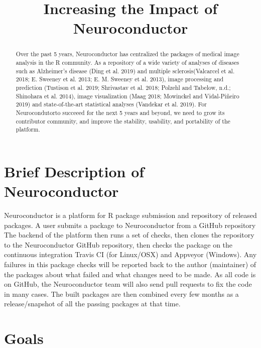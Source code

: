 \documentclass[]{elsarticle} %
\begin{document}
\begin{frontmatter}

  \title{Increasing the Impact of Neuroconductor}
      
  \begin{abstract}
  Over the past 5 years, Neuroconductor has centralized the packages of medical image analysis in the R community. As a repository of a wide variety of analyses of diseases such as Alzheimer's disease (Ding et al. 2019) and multiple sclerosis(Valcarcel et al. 2018; E. Sweeney et al. 2013; E. M. Sweeney et al. 2013), image processing and prediction (Tustison et al. 2019; Shrivastav et al. 2018; Polzehl and Tabelow, n.d.; Shinohara et al. 2014), image visualization (Maag 2018; Mowinckel and Vidal-Piñeiro 2019) and state-of-the-art statistical analyses (Vandekar et al. 2019). For Neurocondutorto succeeed for the next 5 years and beyond, we need to grow its contributor community, and improve the stability, usability, and portability of the platform.
  \end{abstract}
  
 \end{frontmatter}

\hypertarget{brief-description-of-neuroconductor}{%
\section{Brief Description of Neuroconductor}\label{brief-description-of-neuroconductor}}

Neuroconductor is a platform for R package submission and repository of released packages. A user submits a package to Neuroconductor from a GitHub repository The backend of the platform then runs a set of checks, then clones the repository to the Neuroconductor GitHub repository, then checks the package on the continuous integration Travis CI (for Linux/OSX) and Appveyor (Windows). Any failures in this package checks will be reported back to the author (maintainer) of the packages about what failed and what changes need to be made. As all code is on GitHub, the Neuroconductor team will also send pull requests to fix the code in many cases. The built packages are then combined every few months as a release/snapshot of all the passing packages at that time.

\hypertarget{goals}{%
\section{Goals}\label{goals}}
\end{document}
